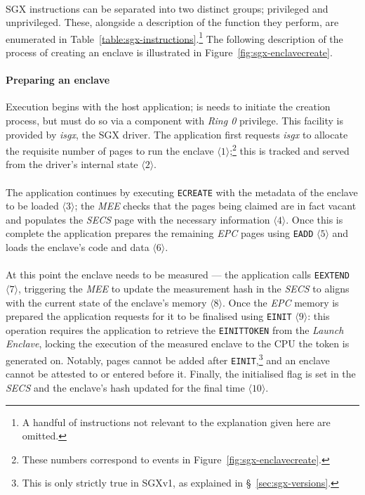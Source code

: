 \paragraph{} SGX instructions can be separated into two distinct groups; privileged and unprivileged. These, alongside a description of the function they perform, are enumerated in Table~\ref{table:sgx-instructions}.\footnote{A handful of instructions not relevant to the explanation given here are omitted.} The following description of the process of creating an enclave is illustrated in Figure~\ref{fig:sgx-enclavecreate}.

\paragraph{Preparing an enclave} Execution begins with the host application; is needs to initiate the creation process, but must do so via a component with \textit{Ring 0} privilege. This facility is provided by \textit{isgx}, the SGX driver. The application first requests \textit{isgx} to allocate the requisite number of pages to run the enclave $\langle 1 \rangle$;\footnote{These numbers correspond to events in Figure~\ref{fig:sgx-enclavecreate}.} this is tracked and served from the driver's internal state $\langle 2 \rangle$.

\paragraph{} The application continues by executing \texttt{ECREATE} with the metadata of the enclave to be loaded $\langle 3 \rangle$; the \textit{MEE} checks that the pages being claimed are in fact vacant and populates the \textit{SECS} page with the necessary information $\langle 4 \rangle$. Once this is complete the application prepares the remaining \textit{EPC} pages using \texttt{EADD} $\langle 5 \rangle$ and loads the enclave's code and data $\langle 6 \rangle$.

\paragraph{} At this point the enclave needs to be measured --- the application calls \texttt{EEXTEND} $\langle 7 \rangle$, triggering the \textit{MEE} to update the measurement hash in the \textit{SECS} to aligns with the current state of the enclave's memory $\langle 8 \rangle$. Once the \textit{EPC} memory is prepared the application requests for it to be finalised using \texttt{EINIT} $\langle 9 \rangle$: this operation requires the application to retrieve the \texttt{EINITTOKEN} from the \textit{Launch Enclave}, locking the execution of the measured enclave to the CPU the token is generated on. Notably, pages cannot be added after \texttt{EINIT},\footnote{This is only strictly true in SGXv1, as explained in §~\ref{sec:sgx-versions}.} and an enclave cannot be attested to or entered before it. Finally, the initialised flag is set in the \textit{SECS} and the enclave's hash updated for the final time $\langle 10 \rangle$.


